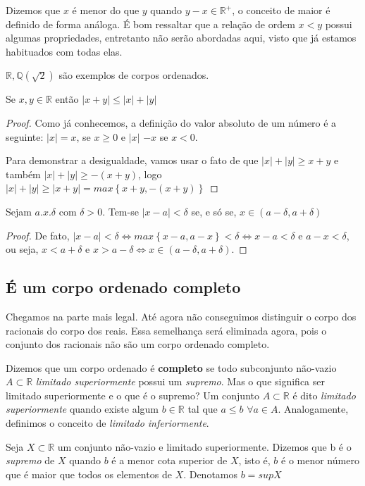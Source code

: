 Dizemos que $x$ é menor do que $y$ quando $y-x \in \mathbb{R}^{+}$, o conceito de maior é definido de forma análoga. É bom ressaltar que a relação de ordem $x<y$ possui algumas propriedades, entretanto não serão abordadas aqui, visto que já estamos habituados com todas elas.

$\mathbb{R},\mathbb{Q}(\sqrt{2})$ são exemplos de corpos ordenados.
\newpage
\begin{prob}
Se $x,y \in \mathbb{R}$ então $|x+y| \leq |x| + |y|$ 
\end{prob}
\begin{proof}
Como já conhecemos, a definição do valor absoluto de um número é a seguinte: $|x|=x$, se $x\geq0$ e $|x|$ $-x$ se $x<0$.

Para demonstrar a desigualdade, vamos usar o fato de que $|x|+|y| \geq x+y$ e também $|x|+|y| \geq -(x+y)$, logo $|x| + |y| \geq |x+y|=max\left \{x+y, -(x+y)  \right \}$
\end{proof}


\begin{theorem}
Sejam $a.x.\delta$ com $\delta>0$. Tem-se $|x-a| < \delta$ se, e só se, $x \in (a-\delta,a+\delta)$
\end{theorem}
\begin{proof}
De fato, $|x-a|<\delta \Leftrightarrow max\left \{ x-a,a-x \right \}<\delta \Leftrightarrow x-a < \delta$ e $a-x < \delta$, ou seja, $x<a+\delta$ e $x>a-\delta \Leftrightarrow x \in (a-\delta,a+\delta)$.
\end{proof}

\subsection{É um corpo ordenado completo}
Chegamos na parte mais legal. Até agora não conseguimos distinguir o corpo dos racionais do corpo dos reais. Essa semelhança será eliminada agora, pois o conjunto dos racionais não são um corpo ordenado completo.

Dizemos que um corpo ordenado é  \textbf{completo} se todo subconjunto não-vazio $A \subset \mathbb{R}$ \textit{limitado superiormente} possui um \textit{supremo}. Mas o que significa ser limitado superiormente e o que é o supremo? Um conjunto $A \subset \mathbb{R}$ é dito \textit{limitado superiormente} quando existe algum $b \in \mathbb{R}$ tal que $a \leq b$ $\forall a \in A$. Analogamente, definimos o conceito de \textit{limitado inferiormente}.

Seja $X \subset \mathbb{R}$ um conjunto não-vazio e limitado superiormente. Dizemos que b é o \textit{supremo} de $X$ quando $b$ é a menor cota superior de $X$, isto é, $b$ é o menor número que é maior que todos os elementos de $X$. Denotamos $b=supX$

